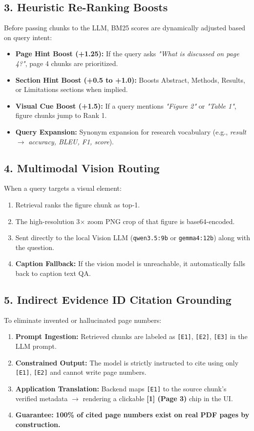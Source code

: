 \documentclass[10pt,a4paper]{article}
\begin{document}
\subsection{3. Heuristic Re-Ranking Boosts}
Before passing chunks to the LLM, BM25 scores are dynamically adjusted based on query intent:
\begin{itemize}[leftmargin=1.5em]
    \item \textbf{Page Hint Boost (+1.25):} If the query asks \textit{"What is discussed on page 4?"}, page 4 chunks are prioritized.
    \item \textbf{Section Hint Boost (+0.5 to +1.0):} Boosts Abstract, Methods, Results, or Limitations sections when implied.
    \item \textbf{Visual Cue Boost (+1.5):} If a query mentions \textit{"Figure 2"} or \textit{"Table 1"}, figure chunks jump to Rank 1.
    \item \textbf{Query Expansion:} Synonym expansion for research vocabulary (e.g., \textit{result} $\rightarrow$ \textit{accuracy, BLEU, F1, score}).
\end{itemize}

\subsection{4. Multimodal Vision Routing}
When a query targets a visual element:
\begin{enumerate}[leftmargin=1.5em, itemsep=1pt]
    \item Retrieval ranks the figure chunk as top-1.
    \item The high-resolution 3$\times$ zoom PNG crop of that figure is base64-encoded.
    \item Sent directly to the local Vision LLM (\texttt{qwen3.5:9b} or \texttt{gemma4:12b}) along with the question.
    \item \textbf{Caption Fallback:} If the vision model is unreachable, it automatically falls back to caption text QA.
\end{enumerate}

\subsection{5. Indirect Evidence ID Citation Grounding}
To eliminate invented or hallucinated page numbers:
\begin{enumerate}[leftmargin=1.5em, itemsep=1pt]
    \item \textbf{Prompt Ingestion:} Retrieved chunks are labeled as \texttt{[E1]}, \texttt{[E2]}, \texttt{[E3]} in the LLM prompt.
    \item \textbf{Constrained Output:} The model is strictly instructed to cite using only \texttt{[E1]}, \texttt{[E2]} and cannot write page numbers.
    \item \textbf{Application Translation:} Backend maps \texttt{[E1]} to the source chunk's verified metadata $\rightarrow$ rendering a clickable \textbf{[1] (Page 3)} chip in the UI.
    \item \textbf{Guarantee:} \textbf{100\% of cited page numbers exist on real PDF pages by construction.}
\end{enumerate}
\end{document}
